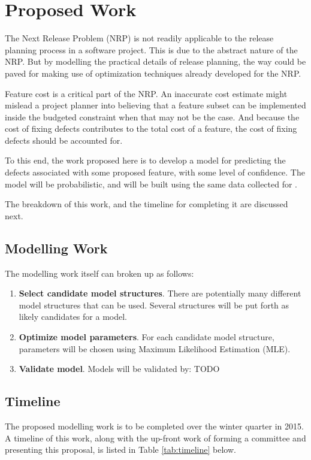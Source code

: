 \documentclass[a4paper]{scrartcl}
\begin{document}
\section{Proposed Work}
\label{sec:proposed_work}

The Next Release Problem (NRP) is not readily applicable to the release planning process in a software project. This is due to the abstract nature of the NRP. But by modelling the practical details of release planning, the way could be paved for making use of optimization techniques already developed for the NRP.

Feature cost is a critical part of the NRP. An inaccurate cost estimate might mislead a project planner into believing that a feature subset can be implemented inside the budgeted constraint when that may not be the case. And because the cost of fixing defects contributes to the total cost of a feature, the cost of fixing defects should be accounted for.

To this end, the work proposed here is to develop a model for predicting the defects associated with some proposed feature, with some level of confidence. The model will be probabilistic, and will be built using the same data collected for .

The breakdown of this work, and the timeline for completing it are discussed next.

\subsection{Modelling Work}
The modelling work itself can broken up as follows:
\begin{enumerate}
\item
\textbf{Select candidate model structures}. There are potentially many different model structures that can be used. Several structures will be put forth as likely candidates for a model.
\item
\textbf{Optimize model parameters}. For each candidate model structure, parameters will be chosen using Maximum Likelihood Estimation (MLE).
\item
\textbf{Validate model}. Models will be validated by: TODO 
\end{enumerate}

\subsection{Timeline}
The proposed modelling work is to be completed over the winter quarter in 2015. A timeline of this work, along with the up-front work of forming a committee and presenting this proposal, is listed in Table \ref{tab:timeline} below.
\end{document}
